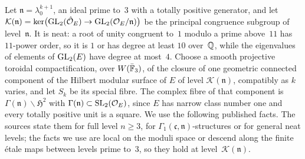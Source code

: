Let $\mathfrak n=\lambda_0^{k+1}$, an ideal prime to~$3$ with a totally positive generator, and let
$\mathcal K(\mathfrak n)=\ker\bigl(\operatorname{GL}_2(\hat{\mathcal{O}}_E)\to\operatorname{GL}_2(\mathcal{O}_E/\mathfrak n)\bigr)$ be the principal congruence subgroup
of level~$\mathfrak n$. It is neat: a root of unity congruent to~$1$ modulo a prime above~$11$ has $11$-power order, so it
is $1$ or has degree at least $10$ over~$\mathbb{Q}$, while the eigenvalues of elements of $\operatorname{GL}_2(E)$ have degree at most~$4$. Choose a
smooth projective toroidal compactification, over $W(\bar{\mathbb{F}}_3)$, of the closure of one geometric connected component of the
Hilbert modular surface of $E$ of level $\mathcal K(\mathfrak n)$, compatibly as $k$ varies, and let $S_k$ be its special
fibre. The complex fibre of that component is
$\Gamma(\mathfrak n)\backslash\mathfrak H^2$ with $\Gamma(\mathfrak n)\subset\operatorname{SL}_2(\mathcal{O}_E)$, since $E$ has narrow class number
one and every totally positive unit is a square. We use the following published facts. The sources state them for full level $n\ge3$, for
$\Gamma_1(\mathfrak c,\mathfrak n)$-structures or for general neat levels; the facts we use are local on the moduli space or
descend along the finite \'etale maps between levels prime to~$3$, so they hold at level~$\mathcal K(\mathfrak n)$.
